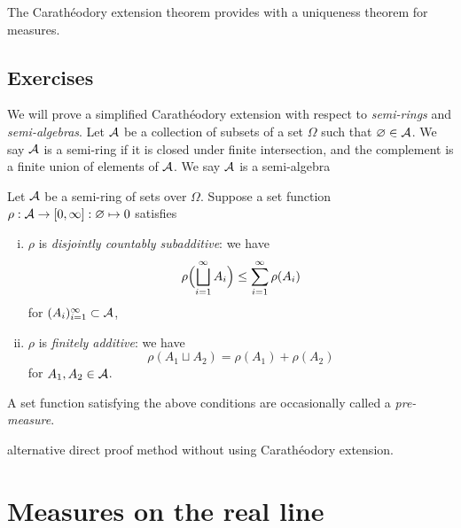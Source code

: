 \documentclass{../note}
\begin{document}
\begin{prb}
The Carath\'eodory extension theorem provides with a uniqueness theorem for measures.
\end{prb}
\begin{pf}
\end{pf}


\section*{Exercises}

\begin{prb}
We will prove a simplified Carath\'eodory extension with respect to \emph{semi-rings} and \emph{semi-algebras}.
Let $\mathcal{A}$ be a collection of subsets of a set $\Omega$ such that $\varnothing\in\mathcal{A}$.
We say $\mathcal{A}$ is a semi-ring if it is closed under finite intersection, and the complement is a finite union of elements of $\mathcal{A}$.
We say $\mathcal{A}$ is a semi-algebra

Let $\mathcal{A}$ be a semi-ring of sets over $\Omega$.
Suppose a set function $\rho:\mathcal{A}\to[0,\infty]:\varnothing\mapsto0$ satisfies
\begin{enumerate}[(i)]
\item $\rho$ is \emph{disjointly countably subadditive}: we have
\[\rho\Bigl(\bigsqcup_{i=1}^\infty A_i\Bigr)\le\sum_{i=1}^\infty\rho(A_i)\]
for $(A_i)_{i=1}^\infty\subset\mathcal{A}$,
\item $\rho$ is \emph{finitely additive}: we have
\[\rho(A_1\sqcup A_2)=\rho(A_1)+\rho(A_2)\]
for $A_1,A_2\in\mathcal{A}$.
\end{enumerate}
A set function satisfying the above conditions are occasionally called a \emph{pre-measure}.
\begin{parts}
\item
\item 
\end{parts}
\end{prb}

\begin{prb}
alternative direct proof method without using Carath\'eodory extension.
\end{prb}





\chapter{Measures on the real line}
\end{document}
